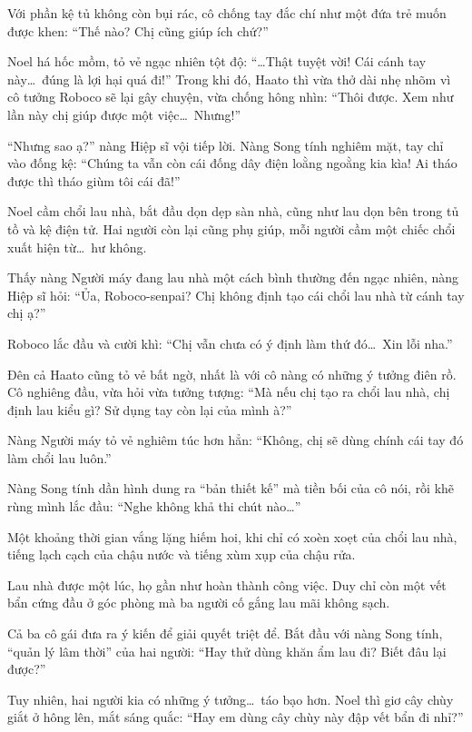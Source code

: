 \documentclass[../main.tex]{subfiles}
\begin{document}
Với phần kệ tủ không còn bụi rác, cô chống tay đắc chí như một đứa trẻ muốn được khen: ``Thế nào? Chị cũng giúp ích chứ?''

Noel há hốc mồm, tỏ vẻ ngạc nhiên tột độ: ``\dots Thật tuyệt vời! Cái cánh tay này\dots\ đúng là lợi hại quá đi!'' Trong khi đó, Haato thì vừa thở dài nhẹ nhõm vì cô tưởng Roboco sẽ lại gây chuyện, vừa chống hông nhìn: ``Thôi được. Xem như lần này chị giúp được một việc\dots\ Nhưng!''

``Nhưng sao ạ?'' nàng Hiệp sĩ vội tiếp lời. Nàng Song tính nghiêm mặt, tay chỉ vào đống kệ: ``Chúng ta vẫn còn cái đống dây điện loằng ngoằng kia kìa! Ai tháo được thì tháo giùm tôi cái đã!''

\ct

Noel cầm chổi lau nhà, bắt đầu dọn dẹp sàn nhà, cũng như lau dọn bên trong tủ tồ và kệ điện tử. Hai người còn lại cũng phụ giúp, mỗi người cầm một chiếc chổi xuất hiện từ\dots\ hư không.

Thấy nàng Người máy đang lau nhà một cách bình thường đến ngạc nhiên, nàng Hiệp sĩ hỏi: ``Ủa, Roboco-senpai? Chị không định tạo cái chổi lau nhà từ cánh tay chị ạ?''

Roboco lắc đầu và cười khì: ``Chị vẫn chưa có ý định làm thứ đó\dots\ Xin lỗi nha.''

Đên cả Haato cũng tỏ vẻ bất ngờ, nhất là với cô nàng có những ý tưởng điên rồ. Cô nghiêng đầu, vừa hỏi vừa tưởng tượng: ``Mà nếu chị tạo ra chổi lau nhà, chị định lau kiểu gì? Sử dụng tay còn lại của mình à?''

Nàng Người máy tỏ vẻ nghiêm túc hơn hẳn: ``Không, chị sẽ dùng chính cái tay đó làm chổi lau luôn.''

Nàng Song tính dần hình dung ra ``bản thiết kế'' mà tiền bối của cô nói, rồi khẽ rùng mình lắc đầu: ``Nghe không khả thi chút nào\dots''

Một khoảng thời gian vắng lặng hiếm hoi, khi chỉ có xoèn xoẹt của chổi lau nhà, tiếng lạch cạch của chậu nước và tiếng xùm xụp của chậu rửa.

\ct

Lau nhà được một lúc, họ gần như hoàn thành công việc. Duy chỉ còn một vết bẩn cứng đầu ở góc phòng mà ba người cố gắng lau mãi không sạch.

Cả ba cô gái đưa ra ý kiến để giải quyết triệt để. Bắt đầu với nàng Song tính, ``quản lý lâm thời'' của hai người: ``Hay thử dùng khăn ẩm lau đi? Biết đâu lại được?''

Tuy nhiên, hai người kia có những ý tưởng\dots\ táo bạo hơn. Noel thì giơ cây chùy giắt ở hông lên, mắt sáng quắc: ``Hay em dùng cây chùy này đập vết bẩn đi nhỉ?''
\end{document}
